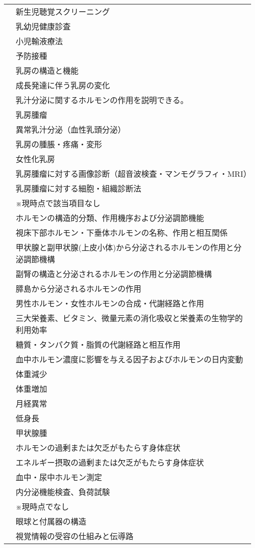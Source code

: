 \begin{xltabular}{\linewidth}{XX}
 & 新生児聴覚スクリーニング \\
 & 乳幼児健康診査 \\
 & 小児輸液療法 \\
 & 予防接種 \\
 & 乳房の構造と機能 \\
 & 成長発達に伴う乳房の変化 \\
 & 乳汁分泌に関するホルモンの作用を説明できる。 \\
 & 乳房腫瘤 \\
 & 異常乳汁分泌（血性乳頭分泌） \\
 & 乳房の腫脹・疼痛・変形 \\
 & 女性化乳房 \\
 & 乳房腫瘤に対する画像診断（超音波検査・マンモグラフィ・MRI） \\
 & 乳房腫瘤に対する細胞・組織診断法 \\
 & ※現時点で該当項目なし \\
 & ホルモンの構造的分類、作用機序および分泌調節機能 \\
 & 視床下部ホルモン・下垂体ホルモンの名称、作用と相互関係 \\
 & 甲状腺と副甲状腺(上皮小体)から分泌されるホルモンの作用と分泌調節機構 \\
 & 副腎の構造と分泌されるホルモンの作用と分泌調節機構 \\
 & 膵島から分泌されるホルモンの作用 \\
 & 男性ホルモン・女性ホルモンの合成・代謝経路と作用 \\
 & 三大栄養素、ビタミン、微量元素の消化吸収と栄養素の生物学的利用効率 \\
 & 糖質・タンパク質・脂質の代謝経路と相互作用 \\
 & 血中ホルモン濃度に影響を与える因子およびホルモンの日内変動 \\
 & 体重減少 \\
 & 体重増加 \\
 & 月経異常 \\
 & 低身長 \\
 & 甲状腺腫 \\
 & ホルモンの過剰または欠乏がもたらす身体症状 \\
 & エネルギー摂取の過剰または欠乏がもたらす身体症状 \\
 & 血中・尿中ホルモン測定 \\
 & 内分泌機能検査、負荷試験 \\
 & ※現時点でなし \\
 & 眼球と付属器の構造 \\
 & 視覚情報の受容の仕組みと伝導路 \\

\end{xltabular}
